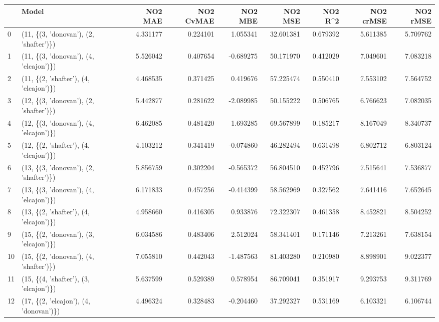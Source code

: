 \begin{tabular}{llrrrrrrr}
\toprule
{} &                                   Model &   NO2 MAE &  NO2 CvMAE &   NO2 MBE &     NO2 MSE &   NO2 R\textasciicircum2 &  NO2 crMSE &   NO2 rMSE \\
\midrule
0  &  (11, \{(3, 'donovan'), (2, 'shafter')\}) &  4.331177 &   0.224101 &  1.055341 &   32.601381 &  0.679392 &   5.611385 &   5.709762 \\
1  &  (11, \{(3, 'donovan'), (4, 'elcajon')\}) &  5.526042 &   0.407654 & -0.689275 &   50.171970 &  0.412029 &   7.049601 &   7.083218 \\
2  &  (11, \{(2, 'shafter'), (4, 'elcajon')\}) &  4.468535 &   0.371425 &  0.419676 &   57.225474 &  0.550410 &   7.553102 &   7.564752 \\
3  &  (12, \{(3, 'donovan'), (2, 'shafter')\}) &  5.442877 &   0.281622 & -2.089985 &   50.155222 &  0.506765 &   6.766623 &   7.082035 \\
4  &  (12, \{(3, 'donovan'), (4, 'elcajon')\}) &  6.462085 &   0.481420 &  1.693285 &   69.567899 &  0.185217 &   8.167049 &   8.340737 \\
5  &  (12, \{(2, 'shafter'), (4, 'elcajon')\}) &  4.103212 &   0.341419 & -0.074860 &   46.282494 &  0.631498 &   6.802712 &   6.803124 \\
6  &  (13, \{(3, 'donovan'), (2, 'shafter')\}) &  5.856759 &   0.302204 & -0.565372 &   56.804510 &  0.452796 &   7.515641 &   7.536877 \\
7  &  (13, \{(3, 'donovan'), (4, 'elcajon')\}) &  6.171833 &   0.457256 & -0.414399 &   58.562969 &  0.327562 &   7.641416 &   7.652645 \\
8  &  (13, \{(2, 'shafter'), (4, 'elcajon')\}) &  4.958660 &   0.416305 &  0.933876 &   72.322307 &  0.461358 &   8.452821 &   8.504252 \\
9  &  (15, \{(2, 'donovan'), (3, 'elcajon')\}) &  6.034586 &   0.483406 &  2.512024 &   58.341401 &  0.171146 &   7.213261 &   7.638154 \\
10 &  (15, \{(2, 'donovan'), (4, 'shafter')\}) &  7.055810 &   0.442043 & -1.487563 &   81.403280 &  0.210980 &   8.898901 &   9.022377 \\
11 &  (15, \{(4, 'shafter'), (3, 'elcajon')\}) &  5.637599 &   0.529389 &  0.578954 &   86.709041 &  0.351917 &   9.293753 &   9.311769 \\
12 &  (17, \{(2, 'elcajon'), (4, 'donovan')\}) &  4.496324 &   0.328483 & -0.204460 &   37.292327 &  0.531169 &   6.103321 &   6.106744 \\

\end{tabular}
